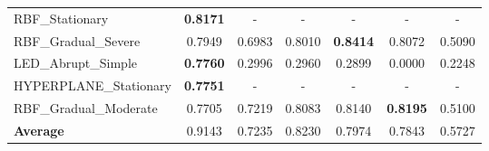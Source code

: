 \begin{table}[htbp]
\begin{tabular}{lcccccc}
RBF_Stationary & \textbf{0.8171} & - & - & - & - & - \\
RBF_Gradual_Severe & 0.7949 & 0.6983 & 0.8010 & \textbf{0.8414} & 0.8072 & 0.5090 \\
LED_Abrupt_Simple & \textbf{0.7760} & 0.2996 & 0.2960 & 0.2899 & 0.0000 & 0.2248 \\
HYPERPLANE_Stationary & \textbf{0.7751} & - & - & - & - & - \\
RBF_Gradual_Moderate & 0.7705 & 0.7219 & 0.8083 & 0.8140 & \textbf{0.8195} & 0.5100 \\
\midrule
\textbf{Average} & 0.9143 & 0.7235 & 0.8230 & 0.7974 & 0.7843 & 0.5727 \\
\bottomrule
\end{tabular}
\end{table}
